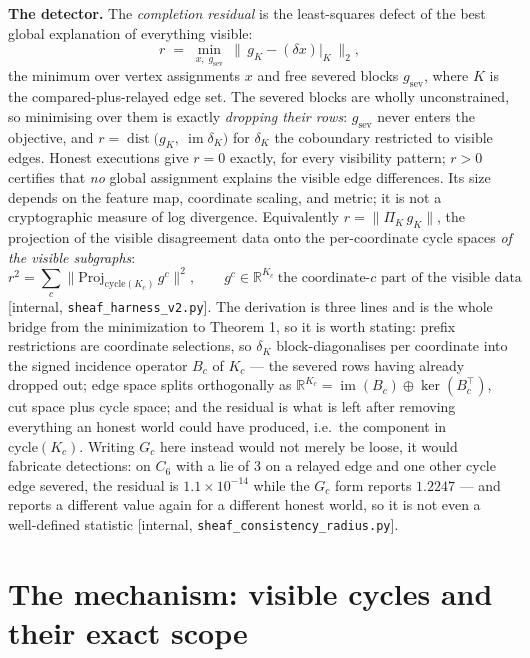 \documentclass[11pt,a4paper]{article}
\begin{document}
\textbf{The detector.} The \emph{completion residual} is the least-squares defect of the best global explanation of
everything visible:
\[
r \;=\; \min_{x,\;g_{\mathrm{sev}}}\ \bigl\|\,g_K-(\delta x)\big|_K\,\bigr\|_2,
\]
the minimum over vertex assignments $x$ and free severed blocks $g_{\mathrm{sev}}$, where $K$ is the compared-plus-relayed
edge set. The severed blocks are wholly unconstrained, so minimising over them is exactly \emph{dropping their rows}:
$g_{\mathrm{sev}}$ never enters the objective, and $r=\operatorname{dist}\bigl(g_K,\ \operatorname{im}\delta_K\bigr)$ for
$\delta_K$ the coboundary restricted to visible edges. Honest executions give $r=0$ exactly, for every visibility pattern;
$r>0$ certifies that \emph{no} global assignment explains the visible edge differences. Its size depends on the feature
map, coordinate scaling, and metric; it is not a cryptographic measure of log divergence. Equivalently $r=\|\Pi_K\,g_K\|$, the projection of
the visible disagreement data onto the per-coordinate cycle spaces \emph{of the visible subgraphs}:
\[
r^2=\sum_c\bigl\|\mathrm{Proj}_{\mathrm{cycle}(K_c)}\,g^c\bigr\|^2,
\qquad g^c\in\mathbb{R}^{K_c}\ \text{the coordinate-$c$ part of the visible data}
\]
[internal, \texttt{sheaf\_harness\_v2.py}]. The derivation is three lines and is the whole bridge from the minimization to
Theorem 1, so it is worth stating: prefix restrictions are coordinate selections, so $\delta_K$ block-diagonalises per
coordinate into the signed incidence operator $B_c$ of $K_c$ --- the severed rows having already dropped out; edge space
splits orthogonally as $\mathbb{R}^{K_c}=\operatorname{im}(B_c)\oplus\ker(B_c^{\!\top})$, cut space plus cycle space; and the
residual is what is left after removing everything an honest world could have produced, i.e.\ the component in
$\mathrm{cycle}(K_c)$. Writing $G_c$ here instead would not merely be loose, it would fabricate detections: on $C_6$ with a
lie of $3$ on a relayed edge and one other cycle edge severed, the residual is $1.1\times10^{-14}$ while the $G_c$ form
reports $1.2247$ --- and reports a different value again for a different honest world, so it is not even a well-defined
statistic [internal, \texttt{sheaf\_consistency\_radius.py}].



\section{The mechanism: visible cycles and their exact scope}\label{sec:mechanism}
\end{document}

